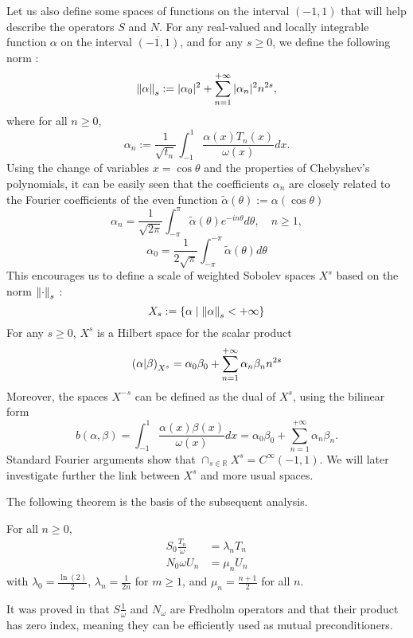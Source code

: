 \documentclass[10pt,a4paper]{article}
\begin{document}
Let us also define some spaces of functions on the interval $(-1,1)$ that will help describe the operators $S$ and $N$. For any real-valued and locally integrable function $\alpha$ on the interval $\overline{(-1,1)}$, and for any $s\geq 0$, we define the following norm :
\[\left\|\alpha\right\|_s:= |\alpha_0|^2 + \sum_{n=1}^{+\infty} |\alpha_n|^2 n^{2s},\]
where for all $n \geq 0$, 
\[\alpha_n := \frac{1}{\sqrt{t_n}}\int_{-1}^{1} \frac{\alpha(x) T_n(x)}{\omega(x)}dx.\] 
Using the change of variables $x = \cos\theta$ and the properties of Chebyshev's polynomials, it can be easily seen that the coefficients $\alpha_n$ are closely related to the Fourier coefficients of the even function $\tilde{\alpha}(\theta) := \alpha(\cos\theta)$
\[\alpha_n = \frac{1}{\sqrt{2\pi}}\int_{-\pi}^{\pi} \tilde{\alpha}(\theta)e^{-in\theta}d\theta, \quad n \geq 1, \]
\[\alpha_0 = \frac{1}{2\sqrt{\pi}}\int_{-\pi}^{-\pi} \tilde{\alpha}(\theta)d\theta\]
This encourages us to define a scale of weighted Sobolev spaces $X^s$ based on the norm $\left\|\cdot\right\|_s$ : 
\[X_s := \left\{\alpha\mathrel{}\middle|\mathrel{}\left\|\alpha\right\|_s < +\infty\right\}\]
For any $s \geq 0$, $X^s$ is a Hilbert space for the scalar product 
\[\left(\alpha|\beta\right)_{X^s} = \alpha_0\beta_0 + \sum_{n=1}^{+\infty} \alpha_n \beta_n n^{2s}\] 
Moreover, the spaces $X^{-s}$ can be defined  as the dual of $X^{s}$, using the bilinear form 
\[b(\alpha,\beta) = \int_{-1}^{1} \frac{\alpha(x)\beta(x)}{\omega(x)}dx = \alpha_0\beta_0 + \sum_{n=1}^{+\infty} \alpha_n \beta_n.\]
Standard Fourier arguments show that $\cap_{s \in \mathbb{R}} X^s = C^{\infty}(-1,1)$. 
We will later investigate further the link between $X^s$ and more usual spaces. 

The following theorem is the basis of the subsequent analysis. 
\begin{The}
	For all $n \geq 0$, 
	\begin{align}
		S_0\frac{T_n}{\omega} &= \lambda_n T_n\\
		N_0\omega U_n &= \mu_n U_n
	\end{align}
	with $\lambda_0 = \frac{\ln(2)}{2}$, $\lambda_n = \frac{1}{2n}$ for $m \geq 1$, and $\mu_n = \frac{n+1}{2}$ for all $n$. 
\end{The}

\begin{Rem}
	It was proved in \cite{bruno2012second} that $S\frac{1}{\omega}$ and $N_\omega$ are Fredholm operators and that their product has zero index, meaning they can be efficiently used as mutual preconditioners.
\end{Rem}
\end{document}

